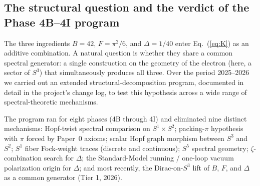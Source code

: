 \documentclass[aps,prl,twocolumn,superscriptaddress]{revtex4-2}
\begin{document}
\subsection{The structural question and the verdict of the Phase 4B--4I
program}\label{sec:structural_question}

The three ingredients $B = 42$, $F = \pi^2/6$, and $\Delta = 1/40$ enter
Eq.~(\ref{eq:K}) as an additive combination. A natural question is
whether they share a common spectral generator: a single construction
on the geometry of the electron (here, a sector of $S^3$) that
simultaneously produces all three. Over the period 2025--2026 we
carried out an extended structural-decomposition program, documented in
detail in the project's change log, to test this hypothesis across a
wide range of spectral-theoretic mechanisms.

The program ran for eight phases (4B through 4I) and eliminated nine
distinct mechanisms:
Hopf-twist spectral comparison on $S^1 \times S^2$;
packing-$\pi$ hypothesis with $\pi$ forced by Paper~0 axioms;
scalar Hopf graph morphism between $S^3$ and $S^2$;
$S^1$ fiber Fock-weight traces (discrete and continuous);
$S^5$ spectral geometry;
$\zeta$-combination search for $\Delta$;
the Standard-Model running / one-loop vacuum polarization origin for
$\Delta$;
and most recently, the Dirac-on-$S^3$ lift of $B$, $F$, and $\Delta$ as
a common generator (Tier 1, 2026).
\end{document}
